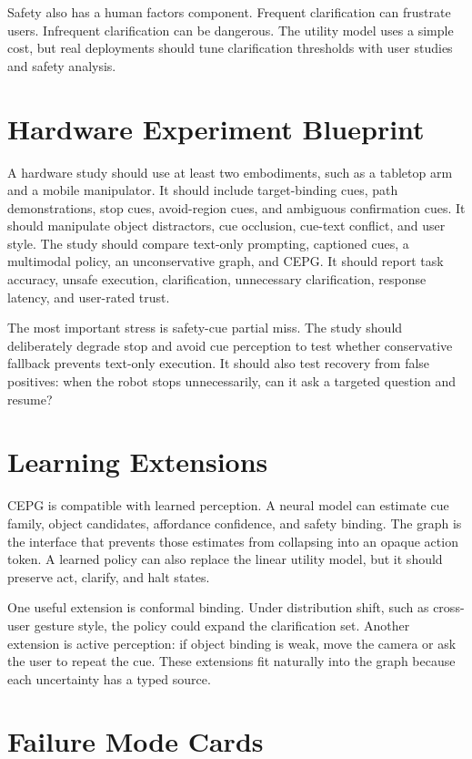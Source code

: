 \documentclass{article}
\newcommand{\method}{CEPG}
\begin{document}
Safety also has a human factors component. Frequent clarification can frustrate users. Infrequent clarification can be dangerous. The utility model uses a simple cost, but real deployments should tune clarification thresholds with user studies and safety analysis.

\section{Hardware Experiment Blueprint}

A hardware study should use at least two embodiments, such as a tabletop arm and a mobile manipulator. It should include target-binding cues, path demonstrations, stop cues, avoid-region cues, and ambiguous confirmation cues. It should manipulate object distractors, cue occlusion, cue-text conflict, and user style. The study should compare text-only prompting, captioned cues, a multimodal policy, an unconservative graph, and \method{}. It should report task accuracy, unsafe execution, clarification, unnecessary clarification, response latency, and user-rated trust.

The most important stress is safety-cue partial miss. The study should deliberately degrade stop and avoid cue perception to test whether conservative fallback prevents text-only execution. It should also test recovery from false positives: when the robot stops unnecessarily, can it ask a targeted question and resume?

\section{Learning Extensions}

\method{} is compatible with learned perception. A neural model can estimate cue family, object candidates, affordance confidence, and safety binding. The graph is the interface that prevents those estimates from collapsing into an opaque action token. A learned policy can also replace the linear utility model, but it should preserve act, clarify, and halt states.

One useful extension is conformal binding. Under distribution shift, such as cross-user gesture style, the policy could expand the clarification set. Another extension is active perception: if object binding is weak, move the camera or ask the user to repeat the cue. These extensions fit naturally into the graph because each uncertainty has a typed source.

\section{Failure Mode Cards}
\end{document}
